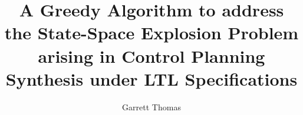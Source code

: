 \documentclass[12pt,a4paper]{report}
\title{A Greedy Algorithm to address the State-Space Explosion Problem arising in Control Planning Synthesis under LTL Specifications}
\author{Garrett Thomas}
\begin{document}
\renewcommand{\thepage}{\roman{page}}
\thispagestyle{empty}

\newpage
\FloatBarrier

\newpage
\FloatBarrier

\newpage
\tableofcontents
\newpage
\listoffigures
\newpage
\FloatBarrier
\setcounter{page}{1}
\renewcommand{\thepage}{\arabic{page}}

\newpage
\FloatBarrier

\newpage
\FloatBarrier

\newpage
\FloatBarrier

\newpage
\FloatBarrier

\newpage
\FloatBarrier

\newpage
\FloatBarrier



\newpage
\FloatBarrier


\end{document}
